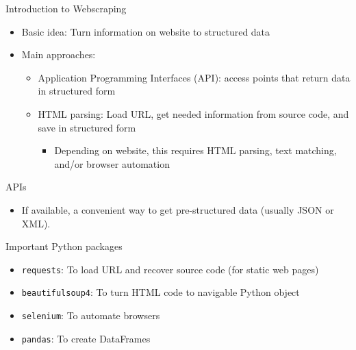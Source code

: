 \begin{frame}{Introduction to Webscraping}
\begin{itemize}
	\item Basic idea: Turn information on website to structured data
	\item Main approaches:
	\begin{itemize}
		\item Application Programming Interfaces (API): access points that return data in structured form
		\item HTML parsing: Load URL, get needed information from source code, and save in structured form
		\begin{itemize}
			\item Depending on website, this requires HTML parsing, text matching, and/or browser automation
		\end{itemize}
	\end{itemize}
\end{itemize}
\end{frame}

\begin{frame}{APIs}
\begin{itemize}
	\item If available, a convenient way to get pre-structured data (usually JSON or XML).
\end{itemize}
\end{frame}

\begin{frame}{Important Python packages}
\begin{itemize}
	\item {\tt requests}: To load URL and recover source code (for static web pages)
	\item {\tt beautifulsoup4}: To turn HTML code to navigable Python object
	\item {\tt selenium}: To automate browsers
	\item {\tt pandas}: To create DataFrames
\end{itemize}

\end{frame}